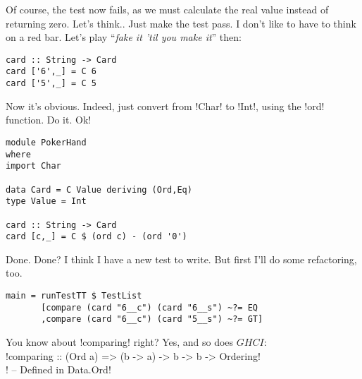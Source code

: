 \failure Of course, the test now fails, as we must calculate the real value instead of returning zero. Let's think..
\lhN \failure Just make the test pass. I don't like to have to think on a red bar.
\lhA \failure Let's play ``\emph{fake it 'til you make it}'' then:
\begin{lstlisting}[frame=single]
card :: String -> Card
card ['6',_] = C 6
card ['5',_] = C 5 
\end{lstlisting}
\success Now it's obvious.
\lhN \success Indeed, just convert from \il!Char! to \il!Int!, using the \il!ord! function. Do it.
\lhA \success Ok!
\begin{lstlisting}[frame=single]
module PokerHand
where
import Char

data Card = C Value deriving (Ord,Eq)
type Value = Int

card :: String -> Card
card [c,_] = C $ (ord c) - (ord '0')
\end{lstlisting} %
\success Done.
\lhN Done? I think I have a new test to write. But first I'll do some refactoring, too.
\begin{lstlisting}[frame=single]
main = runTestTT $ TestList 
       [compare (card "6__c") (card "6__s") ~?= EQ
       ,compare (card "6__c") (card "5__s") ~?= GT]
\end{lstlisting} %
You know about \il!comparing! right?
\lhA Yes, and so does $GHCI$: \\

\il!comparing :: (Ord a) => (b -> a) -> b -> b -> Ordering! \\
\il! -- Defined in Data.Ord! \\


